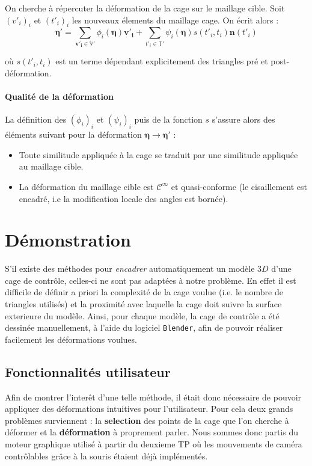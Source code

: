 \documentclass[10pt,a4paper]{article}
\begin{document}
On cherche à répercuter la déformation de la cage sur le maillage cible. Soit $\left( v'_i \right)_i$ et $\left( t'_i \right)_i$ les nouveaux élements du maillage cage. On écrit alors :
\begin{equation}
\label{eq:def}
\mathbf{\eta'} = \sum_{\mathbf{v'_i} \in \mathbb{V}'} \phi_i \left( \mathbf{\eta} \right) \mathbf{v'_i} 
+ \sum_{t'_i \in \mathbb{T}'} \psi_i \left( \mathbf{\eta} \right) s \left(t'_i, t_i \right) \mathbf{n} \left( t'_i \right)
\end{equation}

où $s \left(t'_i, t_i \right)$ est un terme dépendant explicitement des triangles pré et post-déformation.

\paragraph{Qualité de la déformation}La définition des $\left( \phi_i \right)_i$ et $\left( \psi_i \right)_i$ puis de la fonction $s$ s'assure alors des éléments suivant pour la déformation $\boldsymbol\eta \rightarrow \boldsymbol\eta'$ :
\begin{itemize}
\item Toute similitude appliquée à la cage se traduit par une similitude appliquée au maillage cible.
\item La déformation du maillage cible est $\mathcal{C}^\infty$ et quasi-conforme (le cisaillement est encadré, i.e la modification locale des angles est bornée).
\end{itemize}

\section{Démonstration}
S'il existe des méthodes pour \textit{encadrer} automatiquement un modèle $3D$ d'une cage de contrôle, celles-ci ne sont pas adaptées à notre problème. En effet il est difficile de définir a priori la complexité de la cage voulue (i.e. le nombre de triangles utilisés) et la proximité avec laquelle la cage doit suivre la surface exterieure du modèle. Ainsi, pour chaque modèle, la cage de contrôle a été dessinée manuellement, à l'aide du logiciel \texttt{Blender}, afin de pouvoir réaliser facilement les déformations voulues.
 
\subsection{Fonctionnalités utilisateur}
Afin de montrer l'interêt d'une telle méthode, il était donc nécessaire de pouvoir appliquer des déformations intuitives pour l'utilisateur. Pour cela deux grands problèmes surviennent : la \textbf{selection} des points de la cage que l'on cherche à déformer et la \textbf{déformation} à proprement parler. Nous sommes donc partis du moteur graphique utilisé à partir du deuxieme TP où les mouvements de caméra contrôlables grâce à la souris étaient déjà implémentés.
\end{document}
